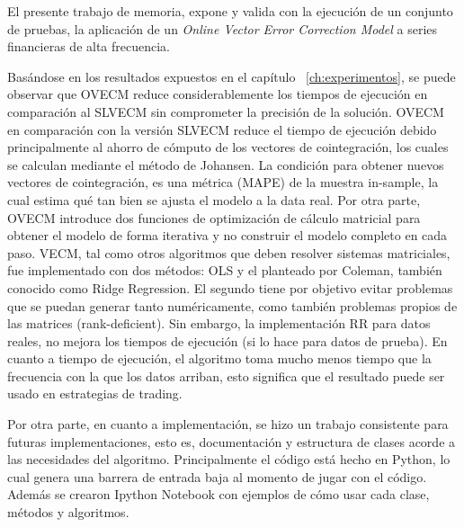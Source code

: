 El presente trabajo de memoria, expone y valida con la ejecución de un conjunto
de pruebas, la aplicación de un  \emph{Online
Vector Error Correction Model} a series financieras de alta frecuencia.

Basándose en los resultados expuestos en el capítulo ~\ref{ch:experimentos}, se
puede observar que OVECM reduce considerablemente los tiempos de ejecución en
comparación al SLVECM sin comprometer la precisión de la solución. OVECM en
comparación con la versión SLVECM reduce el tiempo de ejecución debido
principalmente al ahorro de cómputo de los vectores de cointegración, los
cuales se calculan mediante el método de Johansen. 
La condición para obtener nuevos vectores de cointegración, es una métrica
(MAPE) de la muestra in-sample, la cual estima qué tan bien se ajusta el modelo
a la data real. Por otra parte, OVECM introduce dos funciones de optimización
de cálculo matricial para obtener el modelo de forma iterativa y no construir
el modelo completo en cada paso.  VECM, tal como otros algoritmos que deben
resolver sistemas matriciales, fue implementado con dos métodos: OLS y el
planteado por Coleman, también conocido como Ridge Regression. El segundo tiene
por objetivo evitar problemas que se puedan generar tanto numéricamente, como
también problemas propios de las matrices (rank-deficient). 
Sin embargo, la implementación RR para datos reales, no mejora los tiempos de
ejecución (si lo hace para datos de prueba). En cuanto a tiempo de ejecución,
el algoritmo toma mucho menos tiempo que la frecuencia con la que los datos
arriban, esto significa que el resultado puede ser usado en estrategias de
trading.

Por otra parte, en cuanto a implementación, se hizo un trabajo consistente para
futuras implementaciones, esto es, documentación y estructura de clases acorde
a las necesidades del algoritmo. Principalmente el código está hecho en Python,
lo cual genera una barrera de entrada baja al momento de jugar con el código.
Además se crearon Ipython Notebook con ejemplos de cómo usar cada clase,
métodos y algoritmos.

\newpage
